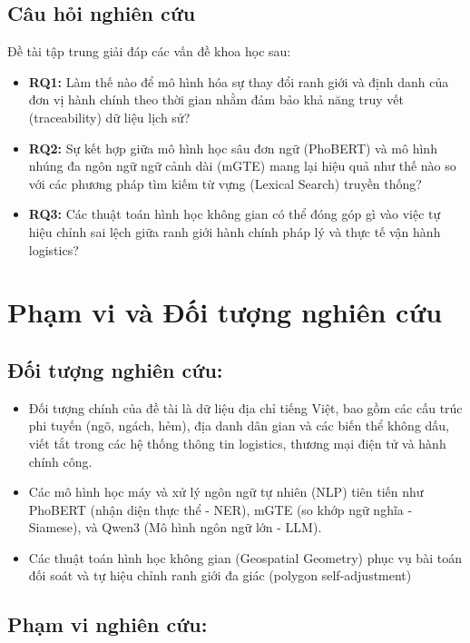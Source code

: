 \subsection{Câu hỏi nghiên cứu}
\label{sec:research-questions}

Đề tài tập trung giải đáp các vấn đề khoa học sau:
\begin{itemize}
\item \textbf{RQ1:} Làm thế nào để mô hình hóa sự thay đổi ranh giới và định danh của đơn vị hành chính theo thời gian nhằm đảm bảo khả năng truy vết (traceability) dữ liệu lịch sử?
\item \textbf{RQ2:} Sự kết hợp giữa mô hình học sâu đơn ngữ (PhoBERT) và mô hình nhúng đa ngôn ngữ ngữ cảnh dài (mGTE) mang lại hiệu quả như thế nào so với các phương pháp tìm kiếm từ vựng (Lexical Search) truyền thống?
\item \textbf{RQ3:} Các thuật toán hình học không gian có thể đóng góp gì vào việc tự hiệu chỉnh sai lệch giữa ranh giới hành chính pháp lý và thực tế vận hành logistics?
\end{itemize}
\section{Phạm vi và Đối tượng nghiên cứu}
\label{sec:phamvi_doituong}

\subsection{Đối tượng nghiên cứu:}
\begin{itemize}
    \item Đối tượng chính của đề tài là dữ liệu địa chỉ tiếng Việt, bao gồm các cấu trúc phi tuyến (ngõ, ngách, hẻm), địa danh dân gian và các biến thể không dấu, viết tắt trong các hệ thống thông tin logistics, thương mại điện tử và hành chính công.
    \item Các mô hình học máy và xử lý ngôn ngữ tự nhiên (NLP) tiên tiến như PhoBERT (nhận diện thực thể - NER), mGTE (so khớp ngữ nghĩa - Siamese), và Qwen3 (Mô hình ngôn ngữ lớn - LLM).
    \item Các thuật toán hình học không gian (Geospatial Geometry) phục vụ bài toán đối soát và tự hiệu chỉnh ranh giới đa giác (polygon self-adjustment)
\end{itemize}

\subsection{Phạm vi nghiên cứu:}


